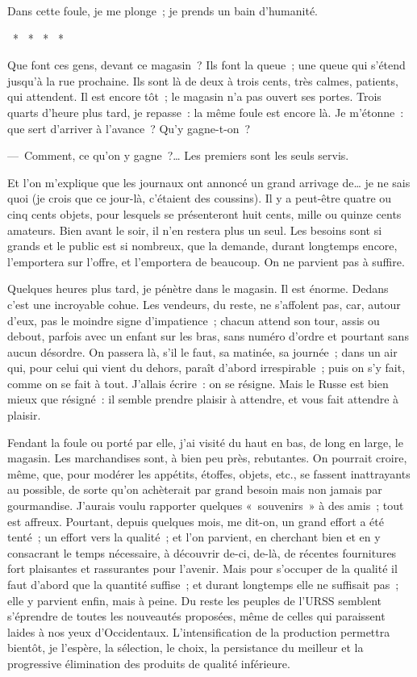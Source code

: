 \documentclass[french,twoside]{book} %
\begin{document}
Dans cette foule, je me plonge ; je prends un bain d’humanité.\par
{\centering \noindent *  *  *  *  *\par}
\noindent Que font ces gens, devant ce magasin ? Ils font la queue ; une queue qui s’étend jusqu’à la rue prochaine. Ils sont là de deux à trois cents, très calmes, patients, qui attendent. Il est encore tôt ; le magasin n’a pas ouvert ses portes. Trois quarts d’heure plus tard, je repasse : la même foule est encore là. Je m’étonne : que sert d’arriver à l’avance ? Qu’y gagne-t-on ?\par
— Comment, ce qu’on y gagne ?… Les premiers sont les seuls servis.\par
Et l’on m’explique que les journaux ont annoncé un grand arrivage de… je ne sais quoi (je crois que ce jour-là, c’étaient des coussins). Il y a peut-être quatre ou cinq cents objets, pour lesquels se présenteront huit cents, mille ou quinze cents amateurs. Bien avant le soir, il n’en restera plus un seul. Les besoins sont si grands et le public est si nombreux, que la demande, durant longtemps encore, l’emportera sur l’offre, et l’emportera de beaucoup. On ne parvient pas à suffire.\par
Quelques heures plus tard, je pénètre dans le magasin. Il est énorme. Dedans c’est une incroyable cohue. Les vendeurs, du reste, ne s’affolent pas, car, autour d’eux, pas le moindre signe d’impatience ; chacun attend son tour, assis ou debout, parfois avec un enfant sur les bras, sans numéro d’ordre et pourtant sans aucun désordre. On passera là, s’il le faut, sa matinée, sa journée ; dans un air qui, pour celui qui vient du dehors, paraît d’abord irrespirable ; puis on s’y fait, comme on se fait à tout. J’allais écrire : on se résigne. Mais le Russe est bien mieux que résigné : il semble prendre plaisir à attendre, et vous fait attendre à plaisir.\par
Fendant la foule ou porté par elle, j’ai visité du haut en bas, de long en large, le magasin. Les marchandises sont, à bien peu près, rebutantes. On pourrait croire, même, que, pour modérer les appétits, étoffes, objets, etc., se fassent inattrayants au possible, de sorte qu’on achèterait par grand besoin mais non jamais par gourmandise. J’aurais voulu rapporter quelques « souvenirs » à des amis ; tout est affreux. Pourtant, depuis quelques mois, me dit-on, un grand effort a été tenté ; un effort vers la qualité ; et l’on parvient, en cherchant bien et en y consacrant le temps nécessaire, à découvrir de-ci, de-là, de récentes fournitures fort plaisantes et rassurantes pour l’avenir. Mais pour s’occuper de la qualité il faut d’abord que la quantité suffise ; et durant longtemps elle ne suffisait pas ; elle y parvient enfin, mais à peine. Du reste les peuples de l’URSS semblent s’éprendre de toutes les nouveautés proposées, même de celles qui paraissent laides à nos yeux d’Occidentaux. L’intensification de la production permettra bientôt, je l’espère, la sélection, le choix, la persistance du meilleur et la progressive élimination des produits de qualité inférieure.\par
\end{document}
